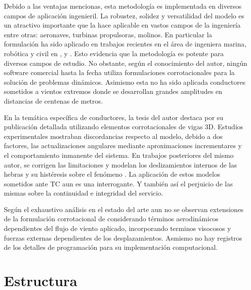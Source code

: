 Debido a las ventajas mencionas, esta metodología es implementada en diversos campos de aplicación ingenieril. La robustez, solidez y versatilidad del modelo es un atractivo importante que la hace aplicable en vastos campos de la ingeniería entre otras: aeronaves, turbinas propulsoras, molinos. En particular la formulación \citep{Le2014}  ha sido aplicado en trabajos recientes en el área de ingeniera marina, robótica y civil en \citep{albino2018co}, \cite{asadi2019multibody} y \cite{viana2020formulation}. Esto evidencia que la metodología es potente para diversos campos de estudio. No obstante, según el conocimiento del autor, ningún software comercial hasta la fecha utiliza formulaciones corrotacionales para la solución de problemas dinámicos. Asimismo esta no ha sido aplicada conductores sometidos a vientos extremos donde se desarrollan grandes amplitudes en distancias de centenas de metros.

En la temática específica de conductores, la tesis del autor \citet{foti2013corotational} destaca por su publicación detallada utilizando elementos corrotacionales de vigas 3D. Estudios experimentales mostraban discordancias respecto al modelo, debido a dos factores, las actualizaciones angulares mediante aproximaciones incrementares y el comportamiento inmanente del sistema. En trabajos posteriores del mismo autor, se corrigen las limitaciones y modelan los deslizamientos internos de las hebras y su histéresis sobre el fenómeno \citet{foti2018finite}. La aplicación de estos modelos sometidos ante \gls{TC} aun es una interrogante. Y también así el perjuicio de las mismas sobre la continuidad e integridad del servicio. 

Según el exhaustivo análisis en el estado del arte aun no se observan extensiones de la formulación corrotacional de \cite{Le2014} considerando términos aerodinámicos dependientes del flujo de viento aplicado, incorporando terminos visocosos y fuerzas externas dependientes de los desplazamientos. Asmismo no hay registros de los detalles de programación para su implementación computacional.

\section{Estructura}

